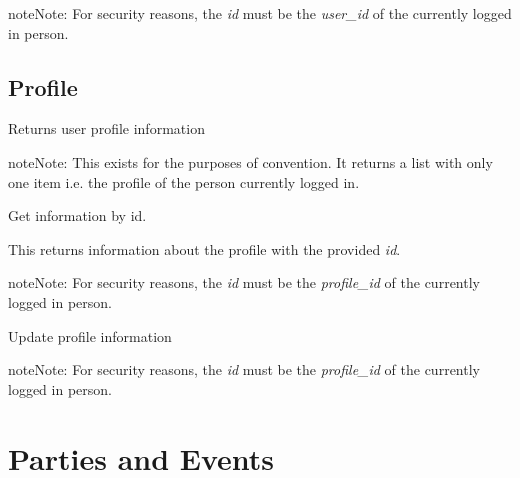 \documentclass[letterpaper,10pt,english]{sphinxmanual}
\begin{document}
\begin{notice}{note}{Note:}
For security reasons, the \emph{id} must be the \emph{user\_id} of the currently logged in person.
\end{notice}


\section{Profile}
\label{accounts:profile}
Returns user profile information


\begin{fulllineitems}
\label{accounts:get--api-v1-profile-}
\end{fulllineitems}


\begin{notice}{note}{Note:}
This exists for the purposes of convention. It returns a list with only one item i.e.
the profile of the person currently logged in.
\end{notice}

Get information by id.


\begin{fulllineitems}
\label{accounts:get--api-v1-profile-_id_-}
\end{fulllineitems}


This returns information about the profile with the provided \emph{id}.

\begin{notice}{note}{Note:}
For security reasons, the \emph{id} must be the \emph{profile\_id} of the currently logged in person.
\end{notice}

Update profile information


\begin{fulllineitems}
\label{accounts:put--api-v1-profile-_id_-}
\end{fulllineitems}


\begin{notice}{note}{Note:}
For security reasons, the \emph{id} must be the \emph{profile\_id} of the currently logged in person.
\end{notice}


\chapter{Parties and Events}
\label{parties:parties-and-events}\label{parties:ref-parties}\label{parties::doc}
\end{document}
